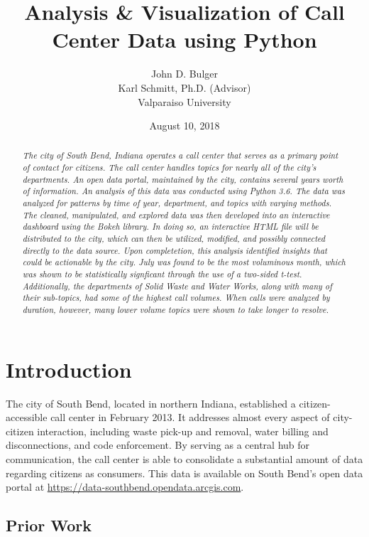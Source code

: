 \documentclass{article}
\title{Analysis \& Visualization of Call Center Data using Python}
\author{John D. Bulger
\\
Karl Schmitt, Ph.D. (Advisor)
\\
Valparaiso University\\
}
\date{August 10, 2018}
\begin{document}
\maketitle

\begin{abstract}
\textit{The city of South Bend, Indiana operates a call center that serves as a primary point of contact for citizens.  The call center handles topics for nearly all of the city's departments.  An open data portal, maintained by the city, contains several years worth of information.  An analysis of this data was conducted using Python 3.6.  The data was 
analyzed for patterns by time of year, department, and topics with varying methods.  The cleaned, manipulated, and explored data was then developed into an 
interactive dashboard using the Bokeh library.  In doing so, an interactive HTML file will be distributed to the city, which can then be utilized, modified, and possibly connected 
directly to the data source.  Upon completetion, this analysis identified insights that could be actionable by the city.  July was found to be the most voluminous month, which was shown to be statistically signficant through the use of a two-sided t-test.  Additionally, the departments of Solid Waste and Water Works, along with many of their sub-topics, had some of the highest call volumes.  When calls were analyzed by duration, however, many lower volume topics were shown to take longer to resolve.}
\end{abstract}

\section{Introduction}
The city of South Bend, located in northern Indiana, established a citizen-accessible call center in February 2013.  It addresses almost every aspect of city-citizen interaction, including waste pick-up and removal, water billing and disconnections, 
and code enforcement.  By serving as a central hub for communication, the call center is able to consolidate a substantial amount of data regarding citizens as consumers.  This data is available on South Bend's open data portal at \href{https://data-southbend.opendata.arcgis.com}{https://data-southbend.opendata.arcgis.com}.

	\subsection{Prior Work}
\end{document}
